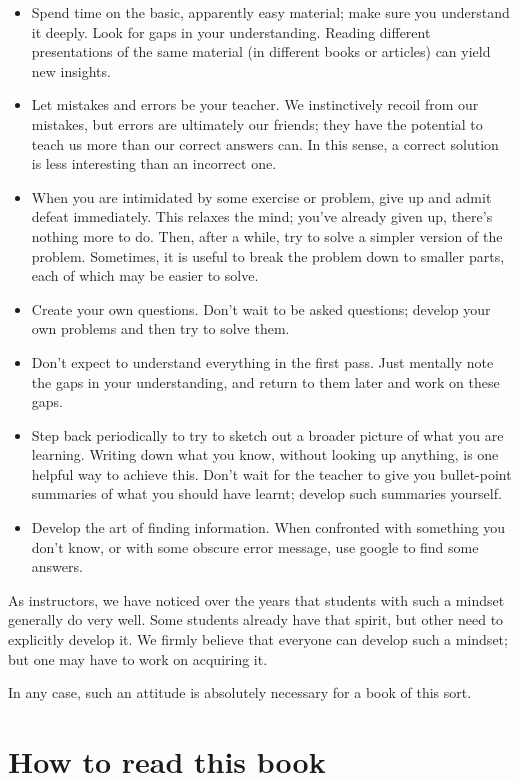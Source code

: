 \documentclass[12pt,]{krantz}
\providecommand{\tightlist}{%
  \setlength{\itemsep}{0pt}\setlength{\parskip}{0pt}}
\theoremstyle{definition}
\theoremstyle{definition}
\theoremstyle{definition}
\theoremstyle{remark}
\begin{document}
\begin{itemize}
\tightlist
\item
  Spend time on the basic, apparently easy material; make sure you understand it deeply. Look for gaps in your understanding. Reading different presentations of the same material (in different books or articles) can yield new insights.
\item
  Let mistakes and errors be your teacher. We instinctively recoil from our mistakes, but errors are ultimately our friends; they have the potential to teach us more than our correct answers can. In this sense, a correct solution is less interesting than an incorrect one.
\item
  When you are intimidated by some exercise or problem, give up and admit defeat immediately. This relaxes the mind; you've already given up, there's nothing more to do. Then, after a while, try to solve a simpler version of the problem. Sometimes, it is useful to break the problem down to smaller parts, each of which may be easier to solve.
\item
  Create your own questions. Don't wait to be asked questions; develop your own problems and then try to solve them.
\item
  Don't expect to understand everything in the first pass. Just mentally note the gaps in your understanding, and return to them later and work on these gaps.
\item
  Step back periodically to try to sketch out a broader picture of what you are learning. Writing down what you know, without looking up anything, is one helpful way to achieve this. Don't wait for the teacher to give you bullet-point summaries of what you should have learnt; develop such summaries yourself.
\item
  Develop the art of finding information. When confronted with something you don't know, or with some obscure error message, use google to find some answers.
\end{itemize}

As instructors, we have noticed over the years that students with such a mindset generally do very well. Some students already have that spirit, but other need to explicitly develop it. We firmly believe that everyone can develop such a mindset; but one may have to work on acquiring it.

In any case, such an attitude is absolutely necessary for a book of this sort.

\hypertarget{how-to-read-this-book}{%
\section{How to read this book}\label{how-to-read-this-book}}
\end{document}
